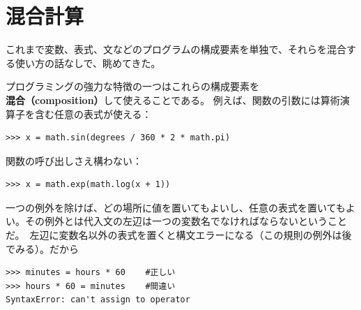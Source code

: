 \documentclass[a4j,12pt,makeidx]{jbook}
\begin{document}
\section{混合計算}
これまで変数、表式、文などのプログラムの構成要素を単独で、それらを混合する使い方の話なしで、眺めてきた。\par
プログラミングの強力な特徴の一つはこれらの構成要素を{\bf 混合（composition）}して使えることである。
例えば、関数の引数には算術演算子を含む任意の表式が使える：
\begin{verbatim}
>>> x = math.sin(degrees / 360 * 2 * math.pi)
\end{verbatim}
関数の呼び出しさえ構わない：
\begin{verbatim}
>>> x = math.exp(math.log(x + 1))
\end{verbatim}
一つの例外を除けば、どの場所に値を置いてもよいし、任意の表式を置いてもよい。その例外とは代入文の左辺は一つの変数名でなければならないということだ。　左辺に変数名以外の表式を置くと構文エラーになる（この規則の例外は後でみる）。だから
\begin{verbatim}
>>> minutes = hours * 60    #正しい
>>> hours * 60 = minutes    #間違い
SyntaxError: can't assign to operator
\end{verbatim}
%
\end{document}
